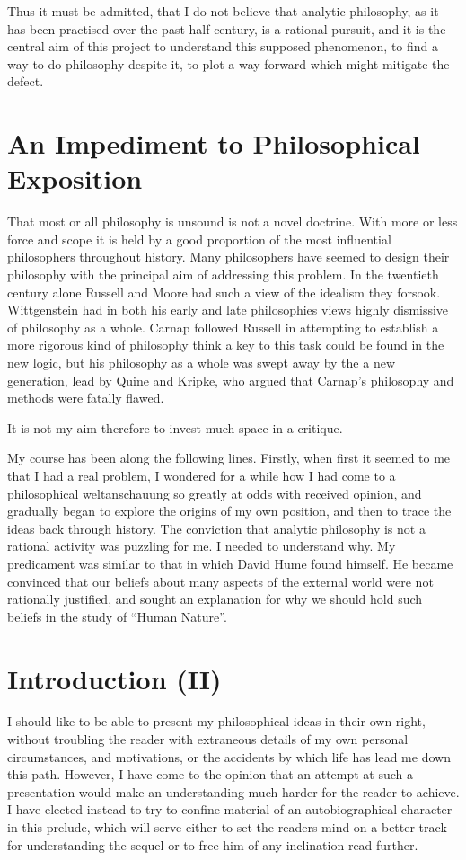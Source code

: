 {Thus it must be admitted, that I do not believe that analytic philosophy, as it has been practised over the past half century, is a rational pursuit, and it is the central aim of this project to understand this supposed phenomenon, to find a way to do philosophy despite it, to plot a way forward which might mitigate the defect.

\section{An Impediment to Philosophical Exposition}

That most or all philosophy is unsound is not a novel doctrine.
With more or less force and scope it is held by a good proportion of the most influential philosophers throughout history.
Many philosophers have seemed to design their philosophy with the principal aim of addressing this problem.
In the twentieth century alone Russell and Moore had such a view of the idealism they forsook.
Wittgenstein had in both his early and late philosophies views highly dismissive of philosophy as a whole.
Carnap followed Russell in attempting to establish a more rigorous kind of philosophy think a key to this task could be found in the new logic, but his philosophy as a whole was swept away by the a new generation, lead by Quine and Kripke, who argued that Carnap's philosophy and methods were fatally flawed.

It is not my aim therefore to invest much space in a critique.

My course has been along the following lines.
Firstly, when first it seemed to me that I had a real problem, I wondered for a while how I had come to a philosophical weltanschauung so greatly at odds with received opinion, and gradually began to explore the origins of my own position, and then to trace the ideas back through history.
The conviction that analytic philosophy is not a rational activity was puzzling for me.
I needed to understand why.
My predicament was similar to that in which David Hume found himself.
He became convinced that our beliefs about many aspects of the external world were not rationally justified, and sought an explanation for why we should hold such beliefs in the study of ``Human Nature''.

\section{Introduction (II)}

I should like to be able to present my philosophical ideas in their own right, without troubling the reader with extraneous details of my own personal circumstances, and motivations, or the accidents by which life has lead me down this path.
However, I have come to the opinion that an attempt at such a presentation would make an understanding much harder for the reader to achieve.
I have elected instead to try to confine material of an autobiographical character in this prelude, which will serve either to set the readers mind on a better track for understanding the sequel or to free him of any inclination read further.

}
